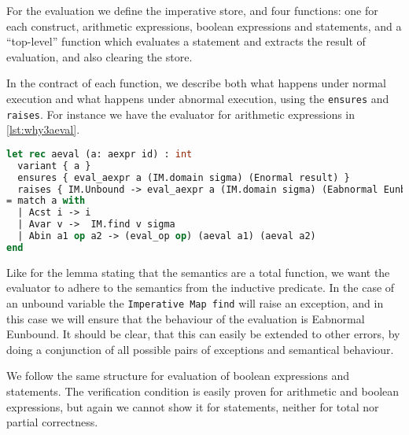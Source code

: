 For the evaluation we define the imperative store, and four functions: one for each construct,
arithmetic expressions, boolean expressions and statements, and a ``top-level'' function which
evaluates a statement and extracts the result of evaluation, and also clearing the store.

In the contract of each function, we describe both what happens under normal execution and what happens under abnormal execution, using the \texttt{ensures} and \texttt{raises}.
For instance we have the evaluator for arithmetic expressions in \autoref{lst:why3aeval}.

\begin{lstlisting}[caption={Evaluation of arithmetic expression},label={lst:why3aeval},language=sml]
let rec aeval (a: aexpr id) : int
  variant { a }
  ensures { eval_aexpr a (IM.domain sigma) (Enormal result) }
  raises { IM.Unbound -> eval_aexpr a (IM.domain sigma) (Eabnormal Eunbound) }
= match a with
  | Acst i -> i
  | Avar v ->  IM.find v sigma
  | Abin a1 op a2 -> (eval_op op) (aeval a1) (aeval a2)
end
\end{lstlisting}

Like for the lemma stating that the semantics
are a total function, we want the evaluator to adhere to the semantics from the inductive predicate.
In the case of an unbound variable the \texttt{Imperative Map find} will raise an exception, and in this case
we will ensure that the behaviour of the evaluation is Eabnormal Eunbound.
It should be clear, that this can easily be extended to other errors, by doing a conjunction of
all possible pairs of exceptions and semantical behaviour.

We follow the same structure for evaluation of boolean expressions and statements.
The verification condition is easily proven for arithmetic and boolean expressions,
but again we cannot show it for statements, neither for total nor partial correctness.

